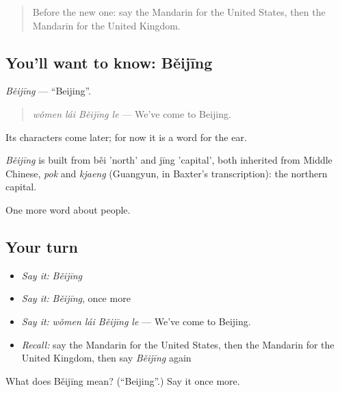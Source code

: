 \label{lesson:ZH-C36-beijing}



\begin{quote}
Before the new one: say the Mandarin for the United States, then the Mandarin for the United Kingdom.
\end{quote}

\subsection*{You'll want to know: Běijīng}
\emph{Běijīng} — \textquotedblleft{}Beijing\textquotedblright{}.

\begin{quote}
\emph{wǒmen lái Běijīng le} — We've come to Beijing.
\end{quote}

Its characters come later; for now it is a word for the ear.

\begin{cousinweb}
\emph{Běijīng} is built from běi 'north' and jīng 'capital', both inherited from Middle Chinese, \emph{pok} and \emph{kjaeng} (Guangyun, in Baxter's transcription): the northern capital.
\end{cousinweb}

\begin{grammarlens}[title={What you've built}]
One more word about people.
\end{grammarlens}

\subsection*{Your turn}
\begin{itemize}
\raggedright
  \item \emph{Say it:} \emph{Běijīng}
  \item \emph{Say it:} \emph{Běijīng}, once more
  \item \emph{Say it:} \emph{wǒmen lái Běijīng le} — We've come to Beijing.
  \item \emph{Recall:} say the Mandarin for the United States, then the Mandarin for the United Kingdom, then say \emph{Běijīng} again
\end{itemize}

\begin{tcolorbox}[breakable,colback=teal!4,colframe=teal!35!black,title={Before you move on}]
What does Běijīng mean? (\textquotedblleft{}Beijing\textquotedblright{}.) Say it once more.
\end{tcolorbox}
